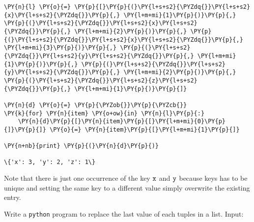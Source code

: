 \begin{Answer}
\begin{codebox}[size=fbox, boxrule=1pt, colback=cellbackground, colframe=cellborder]
\begin{Verbatim}[commandchars=\\\{\}]
\PY{n}{l} \PY{o}{=} \PY{p}{[}\PY{p}{(}\PY{l+s+s2}{\PYZdq{}}\PY{l+s+s2}{x}\PY{l+s+s2}{\PYZdq{}}\PY{p}{,} \PY{l+m+mi}{1}\PY{p}{)}\PY{p}{,} \PY{p}{(}\PY{l+s+s2}{\PYZdq{}}\PY{l+s+s2}{x}\PY{l+s+s2}{\PYZdq{}}\PY{p}{,} \PY{l+m+mi}{2}\PY{p}{)}\PY{p}{,} \PY{p}{(}\PY{l+s+s2}{\PYZdq{}}\PY{l+s+s2}{x}\PY{l+s+s2}{\PYZdq{}}\PY{p}{,} \PY{l+m+mi}{3}\PY{p}{)}\PY{p}{,} \PY{p}{(}\PY{l+s+s2}{\PYZdq{}}\PY{l+s+s2}{y}\PY{l+s+s2}{\PYZdq{}}\PY{p}{,} \PY{l+m+mi}{1}\PY{p}{)}\PY{p}{,} \PY{p}{(}\PY{l+s+s2}{\PYZdq{}}\PY{l+s+s2}{y}\PY{l+s+s2}{\PYZdq{}}\PY{p}{,} \PY{l+m+mi}{2}\PY{p}{)}\PY{p}{,} \PY{p}{(}\PY{l+s+s2}{\PYZdq{}}\PY{l+s+s2}{z}\PY{l+s+s2}{\PYZdq{}}\PY{p}{,} \PY{l+m+mi}{1}\PY{p}{)}\PY{p}{]}

\PY{n}{d} \PY{o}{=} \PY{p}{\PYZob{}}\PY{p}{\PYZcb{}}
\PY{k}{for} \PY{n}{item} \PY{o+ow}{in} \PY{n}{l}\PY{p}{:}
    \PY{n}{d}\PY{p}{[}\PY{n}{item}\PY{p}{[}\PY{l+m+mi}{0}\PY{p}{]}\PY{p}{]} \PY{o}{=} \PY{n}{item}\PY{p}{[}\PY{l+m+mi}{1}\PY{p}{]}
    
\PY{n+nb}{print} \PY{p}{(}\PY{n}{d}\PY{p}{)}

\{'x': 3, 'y': 2, 'z': 1\}
\end{Verbatim}
\end{codebox}

Note that there is just one occurrence of the key $\tt{x}$ and $\tt{y}$ because keys has to be unique and setting the same key to a different value simply overwrite the existing entry.
\end{Answer}

\begin{Exercise}
Write a \texttt{python} program to replace the last value of each tuples in a list.
Input:
\begin{Shaded}
\begin{Highlighting}[]
\OperatorTok{=}\NormalTok{ [(}\NormalTok{, }\NormalTok{, }\NormalTok{), (}\NormalTok{, }\NormalTok{, }\NormalTok{), (}\NormalTok{, }\NormalTok{, }\NormalTok{)]}
\end{Highlighting}
\end{Shaded}
\end{Exercise}

